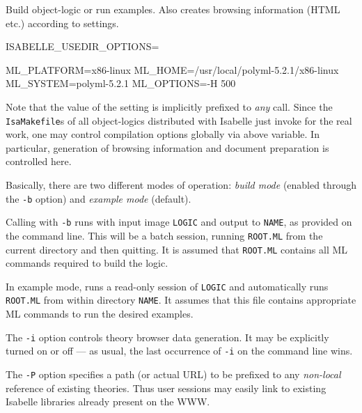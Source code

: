 \begin{isabellebody}
\begin{isamarkuptext}
\begin{ttbox}
  Build object-logic or run examples. Also creates browsing
  information (HTML etc.) according to settings.

  ISABELLE_USEDIR_OPTIONS=

  ML_PLATFORM=x86-linux
  ML_HOME=/usr/local/polyml-5.2.1/x86-linux
  ML_SYSTEM=polyml-5.2.1
  ML_OPTIONS=-H 500
\end{ttbox}

  Note that the value of the \hyperlink{setting.ISABELLE-USEDIR-OPTIONS}{\mbox{}}
  setting is implicitly prefixed to \emph{any} \hyperlink{tool.usedir}{\mbox{}}
  call. Since the \verb|IsaMakefile|s of all object-logics
  distributed with Isabelle just invoke \hyperlink{tool.usedir}{\mbox{}} for the real
  work, one may control compilation options globally via above
  variable. In particular, generation of  browsing
  information and document preparation is controlled here.%
\end{isamarkuptext}%
\isamarkuptrue%
%
\isamarkuptrue%
%
\begin{isamarkuptext}%
Basically, there are two different modes of operation: \emph{build
  mode} (enabled through the \verb|-b| option) and
  \emph{example mode} (default).

  Calling \hyperlink{tool.usedir}{\mbox{}} with \verb|-b| runs \hyperlink{executable.isabelle-process}{\mbox{}} with input image \verb|LOGIC| and output to
  \verb|NAME|, as provided on the command line. This will be a
  batch session, running \verb|ROOT.ML| from the current
  directory and then quitting.  It is assumed that \verb|ROOT.ML|
  contains all ML commands required to build the logic.

  In example mode, \hyperlink{tool.usedir}{\mbox{}} runs a read-only session of
  \verb|LOGIC| and automatically runs \verb|ROOT.ML| from
  within directory \verb|NAME|.  It assumes that this file
  contains appropriate ML commands to run the desired examples.

  \medskip The \verb|-i| option controls theory browser data
  generation. It may be explicitly turned on or off --- as usual, the
  last occurrence of \verb|-i| on the command line wins.

  The \verb|-P| option specifies a path (or actual URL) to be
  prefixed to any \emph{non-local} reference of existing theories.
  Thus user sessions may easily link to existing Isabelle libraries
  already present on the WWW.


\end{isamarkuptext}
\end{isabellebody}
